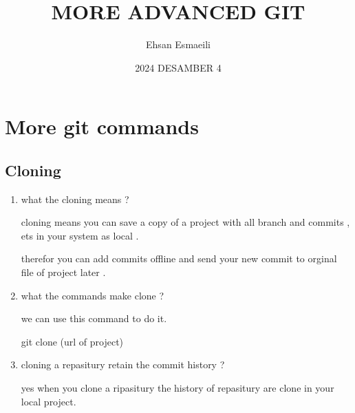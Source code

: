 \documentclass{article}
\title{MORE ADVANCED GIT}
\date{2024 DESAMBER 4}
\author{Ehsan Esmaeili}
\begin{document}
\maketitle
\newpage

\section*{More git commands}

\subsection*{Cloning}
\begin{enumerate}
    \item what the cloning means ? 

    cloning means you can save a copy of a project with all branch and commits , ets in your system as local .

    therefor you can add commits offline and send your new commit to orginal file of project later .
    \item what the commands make clone ?

    we can use this command to do it.
    
    git clone (url of project) 
    \item cloning a repasitury retain the commit history ?

    yes when you clone a ripasitury the history of repasitury are clone in your local project.
\end{enumerate}
\end{document}
